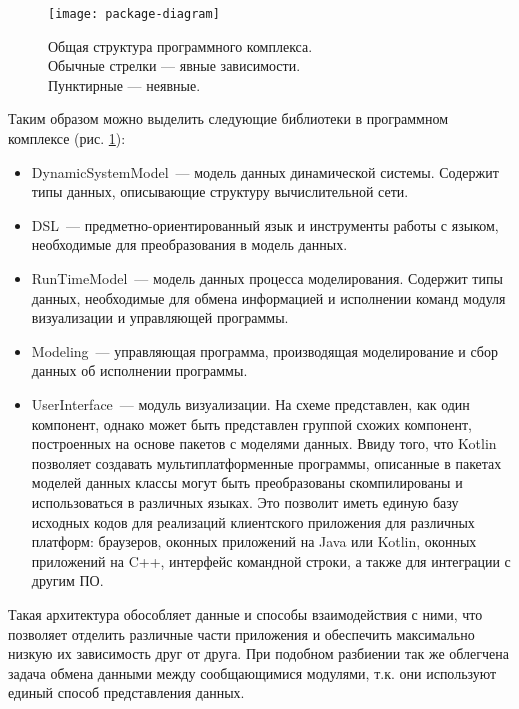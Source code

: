 \begin{figure}[h]
\centering
\texttt{[image: package-diagram]}
\caption{Общая структура программного комплекса.\\Обычные стрелки --- явные зависимости.\\Пунктирные --- неявные.}
\label{fig:package-diagram}
\end{figure}
\FloatBarrier
Таким образом можно выделить следующие библиотеки в программном комплексе (рис. \ref{fig:package-diagram}):
\begin{itemize}
	\item DynamicSystemModel~--- модель данных динамической системы. Содержит типы данных, описывающие структуру вычислительной сети.
	\item DSL~--- предметно-ориентированный язык и инструменты работы с языком, необходимые для преобразования в модель данных.
	\item RunTimeModel~--- модель данных процесса моделирования. Содержит типы данных, необходимые для обмена информацией и исполнении команд модуля визуализации и управляющей программы.
	\item Modeling~--- управляющая программа, производящая моделирование и сбор данных об исполнении программы.
	\item UserInterface~--- модуль визуализации. 
	На схеме представлен, как один компонент, однако может быть представлен группой схожих компонент, построенных на основе пакетов с моделями данных. 
	Ввиду того, что Kotlin позволяет создавать мультиплатформенные программы, описанные в пакетах моделей данных классы могут быть преобразованы скомпилированы и использоваться в различных языках. 
	Это позволит иметь единую базу исходных кодов для реализаций клиентского приложения для различных платформ: браузеров, оконных приложений на Java или Kotlin, оконных приложений на C++, интерфейс командной строки, а также для интеграции с другим ПО.
\end{itemize}

Такая архитектура обособляет данные и способы взаимодействия с ними, что позволяет отделить различные части приложения и обеспечить максимально низкую их зависимость друг от друга.
При подобном разбиении так же облегчена задача обмена данными между сообщающимися модулями, т.к. они используют единый способ представления данных.



